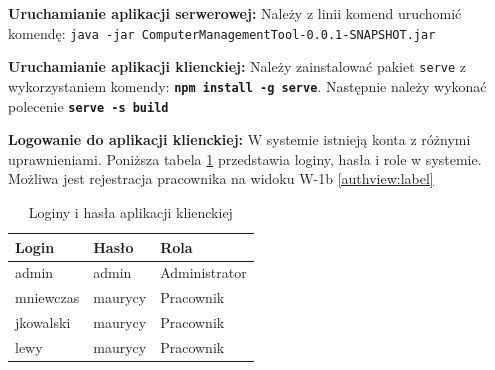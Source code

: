 \textbf{Uruchamianie aplikacji serwerowej:}
Należy z linii komend uruchomić komendę: \mbox{\texttt{java -jar ComputerManagementTool-0.0.1-SNAPSHOT.jar}}

\textbf{Uruchamianie aplikacji klienckiej:}
Należy zainstalować pakiet \texttt{serve} z wykorzystaniem komendy: \textbf{\texttt{npm install -g serve}}. Następnie należy wykonać polecenie \textbf{\texttt{serve -s build}}

\textbf{Logowanie do aplikacji klienckiej:}
W systemie istnieją konta z różnymi uprawnieniami. Poniższa tabela \ref{tab:loginKlient} przedstawia loginy, hasła i role w systemie. Możliwa jest rejestracja pracownika na widoku W-1b \ref{authview:label}
 

\begin{table}[htb] \small
	\centering
\caption{Loginy i hasła aplikacji klienckiej}
\label{tab:loginKlient}
\begin{tabularx}{0.5\linewidth}{|X|X|X|}
		\hline
    Login & Hasło & Rola \\
		\hline
    admin & admin & Administrator\\
    \hline
    mniewczas & maurycy & Pracownik \\
    \hline
    jkowalski & maurycy &  Pracownik \\
    \hline
    lewy & maurycy & Pracownik \\
    \hline
\end{tabularx}
\end{table}




















